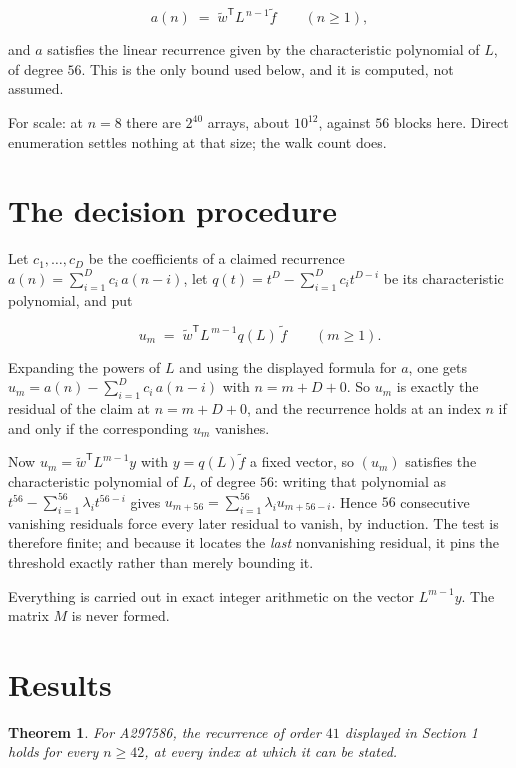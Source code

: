 \documentclass[11pt]{article}
\newtheorem{theorem}{Theorem}
\theoremstyle{definition}
\begin{document}
\[a(n) \;=\; \tilde w^{\mathsf T} L^{\,n-1} \tilde f \qquad (n \ge 1),\]

and $a$ satisfies the linear recurrence given by the characteristic polynomial of $L$, of degree $56$. This is the only bound used below, and it is computed, not assumed.

For scale: at $n = 8$ there are $2^{40}$ arrays, about $10^{12}$, against $56$ blocks here. Direct enumeration settles nothing at that size; the walk count does.

\section{The decision procedure}

Let $c_1,\dots,c_D$ be the coefficients of a claimed recurrence $a(n) = \sum_{i=1}^{D} c_i\,a(n-i)$, let $q(t) = t^{D} - \sum_{i=1}^{D} c_i t^{D-i}$ be its characteristic polynomial, and put

\[u_m \;=\; \tilde w^{\mathsf T} L^{\,m-1} q(L)\,\tilde f \qquad (m \ge 1).\]

Expanding the powers of $L$ and using the displayed formula for $a$, one gets $u_m = a(n) - \sum_{i=1}^{D} c_i\,a(n-i)$ with $n = m + D + 0$. So $u_m$ is exactly the residual of the claim at $n = m + D + 0$, and the recurrence holds at an index $n$ if and only if the corresponding $u_m$ vanishes.

Now $u_m = \tilde w^{\mathsf T} L^{m-1} y$ with $y = q(L)\tilde f$ a fixed vector, so $(u_m)$ satisfies the characteristic polynomial of $L$, of degree $56$: writing that polynomial as $t^{56} - \sum_{i=1}^{56} \lambda_i t^{56-i}$ gives $u_{m+56} = \sum_{i=1}^{56} \lambda_i u_{m+56-i}$. Hence $56$ consecutive vanishing residuals force every later residual to vanish, by induction. The test is therefore finite; and because it locates the {\itshape last} nonvanishing residual, it pins the threshold exactly rather than merely bounding it.

Everything is carried out in exact integer arithmetic on the vector $L^{m-1}y$. The matrix $M$ is never formed.

\section{Results}

\begin{theorem} For A297586, the recurrence of order $41$ displayed in Section 1 holds for every $n \ge 42$, at every index at which it can be stated.\end{theorem}
\end{document}
